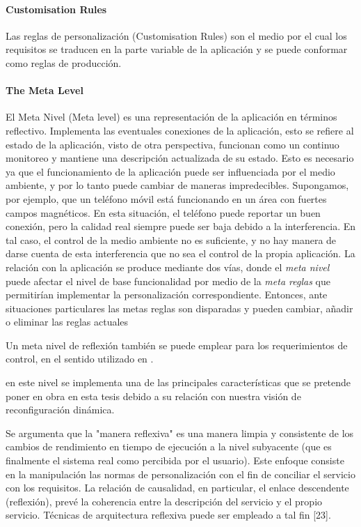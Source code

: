 \paragraph{Customisation Rules}

Las reglas de personalización (Customisation Rules) 
son el medio por el cual los requisitos se traducen
en la parte variable de la aplicación y
se puede conformar como reglas de producción.


\paragraph{The Meta Level}

El Meta Nivel (Meta level) es una representación de la aplicación en términos
reflectivo. Implementa las eventuales conexiones de la aplicación, esto se
refiere al estado de la aplicación, visto de otra perspectiva, funcionan como
un continuo monitoreo y mantiene una descripción actualizada de su
estado. Esto es necesario ya que el funcionamiento de la aplicación
puede ser influenciada por el medio ambiente, y por lo tanto puede cambiar de
maneras impredecibles. Supongamos, por ejemplo, que un
teléfono móvil está funcionando en un área con fuertes campos magnéticos. En
esta situación, el teléfono puede reportar un buen
conexión, pero la calidad real siempre puede ser baja debido a la interferencia.
En tal caso, el control de la
medio ambiente no es suficiente, y no hay manera de darse cuenta de esta
interferencia que no sea el control de la propia aplicación.
La relación con la aplicación se produce mediante dos vías, donde el
\textit{meta nivel } puede afectar el nivel de
base
funcionalidad por medio de la \textit{meta reglas} que permitirían implementar
la personalización correspondiente. Entonces, ante situaciones particulares
las metas reglas son disparadas y pueden cambiar, a\~nadir o eliminar las
reglas actuales

Un meta nivel de reflexión también se puede emplear para los
requerimientos de control, en el sentido utilizado en \cite{uwa.7}.

en este nivel se implementa una de las principales características que se
pretende poner en obra en esta tesis debido a su relación con
nuestra visión de reconfiguración dinámica. 


Se argumenta que la "manera reflexiva" es una manera limpia y consistente de los
cambios de rendimiento en tiempo de ejecución a la
nivel subyacente (que es finalmente el sistema real como percibida por el
usuario). Este enfoque consiste en la manipulación
las normas de personalización con el fin de conciliar el servicio con los
requisitos. La relación de causalidad, en particular,
el enlace descendente (reflexión), prevé la coherencia entre la descripción del
servicio y el propio servicio.
Técnicas de arquitectura reflexiva puede ser empleado a tal fin [23].




